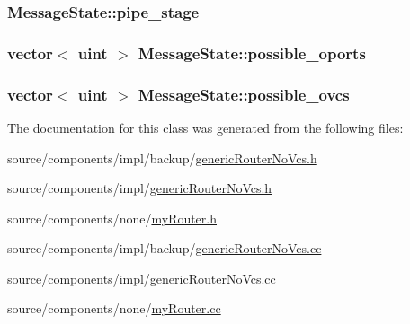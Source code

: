\hypertarget{classMessageState_d4cb410d4a081d6e2f7b79c49298d905}{
\subsubsection[{pipe\_\-stage}]{ {\bf MessageState::pipe\_\-stage}}}
\label{classMessageState_d4cb410d4a081d6e2f7b79c49298d905}


\hypertarget{classMessageState_377d4cf5d0d42ac641e9ca890e9276b0}{
\subsubsection[{possible\_\-oports}]{\setlength{\rightskip}{0pt plus 5cm}vector$<$ {\bf uint} $>$ {\bf MessageState::possible\_\-oports}}}
\label{classMessageState_377d4cf5d0d42ac641e9ca890e9276b0}


\hypertarget{classMessageState_d21e16291161c6a70e4a962a71c5b3d0}{
\subsubsection[{possible\_\-ovcs}]{\setlength{\rightskip}{0pt plus 5cm}vector$<$ {\bf uint} $>$ {\bf MessageState::possible\_\-ovcs}}}
\label{classMessageState_d21e16291161c6a70e4a962a71c5b3d0}




The documentation for this class was generated from the following files:\begin{CompactItemize}
\item 
source/components/impl/backup/\hyperlink{backup_2genericRouterNoVcs_8h}{genericRouterNoVcs.h}\item 
source/components/impl/\hyperlink{genericRouterNoVcs_8h}{genericRouterNoVcs.h}\item 
source/components/none/\hyperlink{myRouter_8h}{myRouter.h}\item 
source/components/impl/backup/\hyperlink{backup_2genericRouterNoVcs_8cc}{genericRouterNoVcs.cc}\item 
source/components/impl/\hyperlink{genericRouterNoVcs_8cc}{genericRouterNoVcs.cc}\item 
source/components/none/\hyperlink{myRouter_8cc}{myRouter.cc}\end{CompactItemize}
